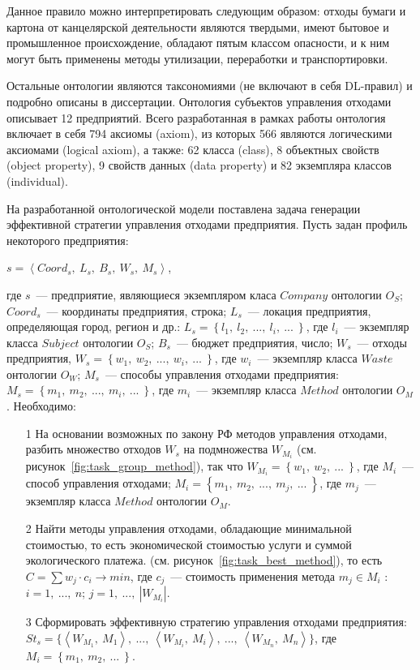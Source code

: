 \documentclass[a4paper]{G2-105}
\begin{document}
Данное правило можно интерпретировать следующим образом: отходы бумаги и картона от канцелярской деятельности являются твердыми, имеют бытовое и промышленное происхождение, обладают пятым классом опасности, и к ним могут быть применены методы утилизации, переработки и транспортировки.

Остальные онтологии являются таксономиями (не включают в себя DL-правил) и подробно описаны в диссертации. Онтология субъектов управления отходами описывает 12 предприятий. Всего  разработанная в рамках работы онтология включает в себя 794 аксиомы (axiom), из которых 566 являются логическими аксиомами (logical axiom), а также: 62 класса (class), 8 объектных свойств (object property), 9 свойств данных (data property) и 82 экземпляра классов (individual).

На разработанной онтологической модели поставлена задача генерации эффективной стратегии управления отходами предприятия. Пусть задан профиль некоторого предприятия: 

$s = \left<Coord_{s},~L_{s},~B_{s},~W_{s},~M_{s}\right>$, 

где $s$~--- предприятие, являющиеся экземпляром класа $Company$ онтологии $O_{S}$; $Coord_{s}$~--- координаты предприятия, строка; $L_{s}$~--- локация предприятия, определяющая город, регион и др.: $L_{s} = \left\{l_{1},~l_{2},~...,~l_{i},~...~\right\}$, где $l_{i}$~--- экземпляр класса $Subject$ онтологии $O_{S}$; $B_{s}$~--- бюджет предприятия, число; $W_{s}$~--- отходы предприятия, $W_{s} = \left\{w_{1},~w_{2},~...,~w_{i},~...~\right\}$, где $w_{i}$~--- экземпляр класса $Waste$ онтологии $O_{W}$; $M_{s}$~--- способы управления отходами предприятия: $M_{s} = \left\{m_{1},~m_{2},~...,~m_{i},~...~\right\}$, где $m_{i}$~--- экземпляр класса $Method$ онтологии $O_{M}$. Необходимо:
\begin{enumerate}
\item [1] На основании возможных по закону РФ методов управления отходами, разбить множество отходов $W_{s}$ на подмножества $W_{M_{i}}$ (см. рисунок~\ref{fig:task_group_method}), так что $W_{M_{i}} = \left\{w_{1},~w_{2},~...~\right\}$, где  $M_{i}$~--- способ управления отходами; $M_{i}=\left\{m_{1},~m_{2},~...,~m_{j},~...~\right\}$, где $m_{j}$~--- экземпляр класса $Method$ онтологии $O_{M}$.
\item [2] Найти методы управления отходами, обладающие минимальной стоимостью, то есть экономической стоимостью услуги и суммой экологического платежа. (см. рисунок~\ref{fig:task_best_method}), то есть $C = \sum w_{j} \cdot c_{i} \rightarrow min$, где $c_{j}$~--- стоимость применения метода $m_{j} \in M_{i}$ : $i=1,~...,~n$; $j=1,~...,~|W_{M_{i}}|$.
\item [3] Сформировать эффективную стратегию управления отходами предприятия: $St_{s} = \{\left<W_{M_{1}},~M_{1}\right>,~...,~\left<W_{M_{i}},~M_{i}\right>,~...,~\left<W_{M_{n}},~M_{n}\right>\}$, где $M_{i}=\left\{m_{1},~m_{2},~...~\right\}$.
\end{enumerate}
\end{document}

